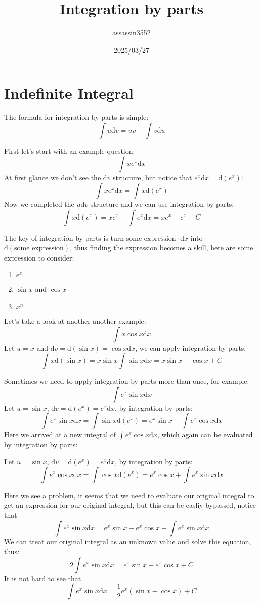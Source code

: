 \documentclass{article}
\title{Integration by parts}
\author{assassin3552}
\date{2025/03/27}
\numberwithin{equation}{section}
\begin{document}
\maketitle

\section{Indefinite Integral}
The formula for integration by parts is simple:
\[
\int u \mathrm{d}v = uv - \int v \mathrm{d}u
\]

First let's start with an example question:
\[
\int x e^x \mathrm{d}x
\]
At first glance we don't see the $\mathrm{d}v$ structure, but notice that $e^x \mathrm{d}x = \mathrm{d}(e^x)$:
\[
\int x e^x \mathrm{d}x = \int x \mathrm{d}(e^x)
\]
Now we completed the $u\mathrm{d}v$ structure and we can use integration by parts:
\[
    \int x \mathrm{d}(e^x) = x e^x - \int e^x \mathrm{d}x = x e^x - e^x + C
\]

The key of integration by parts is turn $\text{some expression}\cdot \mathrm{d}x$ into $\mathrm{d}(\text{some expression})$, 
thus finding the expression becomes a skill, here are some expression to consider:
\begin{enumerate}
    \item $e^x$
    \item $\sin x$ and $\cos x$
    \item $x^n$
\end{enumerate}

Let's take a look at another another example:
\[
\int x\cos x \mathrm{d}x
\]
Let $u = x$ and $\mathrm{d}v = \mathrm{d}(\sin x) = \cos x \mathrm{d}x$, we can apply integration by parts:
\[
\int x \mathrm{d}(\sin x) = x\sin x \int \sin x \mathrm{d}x = x \sin x - \cos x + C
\]

\newpage
Sometimes we need to apply integration by parts more than once, for example:
\[
\int e^x \sin x \mathrm{d}x
\]
Let $u = \sin x$, $\mathrm{d}v = \mathrm{d}(e^x) = e^x \mathrm{d}x$, by integration by parts:
\[
\int e^x \sin x \mathrm{d}x = \int \sin x \mathrm{d}(e^x) = e^x \sin x - \int e^x \cos x \mathrm{d}x
\]
Here we arrived at a new integral of $\int e^x \cos x \mathrm{d}x$, which again can be evaluated by integration by parts:

Let $u = \sin x$, $\mathrm{d}v = \mathrm{d}(e^x) = e^x \mathrm{d}x$, by integration by parts:
\[
\int e^x \cos x \mathrm{d}x = \int \cos x \mathrm{d}(e^x) = e^x \cos x + \int e^x \sin x \mathrm{d}x
\]

Here we see a problem, it seems that we need to evaluate our original integral to get an expression for our original integral, but this can be easliy bypassed,
notice that
\[
\int e^x \sin x \mathrm{d}x = e^x \sin x - e^x \cos x - \int e^x \sin x \mathrm{d}x
\]
We can treat our original integral as an unknown value and solve this equation, thus:
\[
2 \int e^x \sin x \mathrm{d}x = e^x \sin x - e^x \cos x + C
\]
It is not hard to see that
\[
\int e^x \sin x \mathrm{d}x = \frac{1}{2}e^x (\sin x - \cos x) + C
\]
\end{document}
